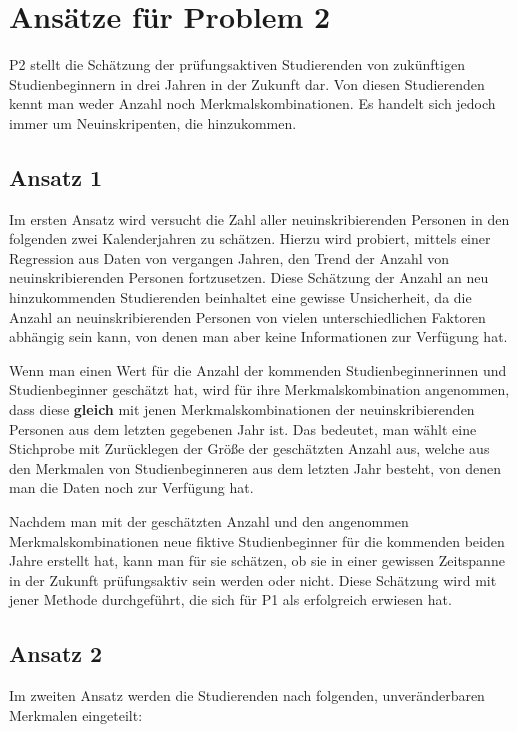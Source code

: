 

\section{Ans\"atze f\"ur Problem 2}
P2 stellt die Sch\"atzung der pr\"ufungsaktiven Studierenden von zuk\"unftigen Studienbeginnern in drei Jahren in der Zukunft dar. Von diesen Studierenden
kennt man weder Anzahl noch Merkmalskombinationen. Es handelt sich jedoch immer um Neuinskripenten, die hinzukommen.

\subsection{Ansatz 1}
Im ersten Ansatz wird versucht die Zahl aller neuinskribierenden Personen in den folgenden zwei Kalenderjahren zu sch\"atzen. Hierzu wird probiert, mittels einer Regression aus
Daten von vergangen Jahren, den Trend der Anzahl von neuinskribierenden Personen fortzusetzen. Diese Sch\"atzung der Anzahl an neu hinzukommenden Studierenden beinhaltet
eine gewisse Unsicherheit, da die Anzahl an neuinskribierenden Personen von vielen unterschiedlichen Faktoren abh\"angig sein kann, von denen man 
aber keine Informationen zur Verf\"ugung hat.

Wenn man einen Wert f\"ur die Anzahl der kommenden Studienbeginnerinnen und Studienbeginner gesch\"atzt hat, wird f\"ur ihre Merkmalskombination angenommen,
dass diese \textbf{gleich} mit jenen Merkmalskombinationen der neuinskribierenden Personen aus dem letzten gegebenen Jahr ist. Das bedeutet, man w\"ahlt eine Stichprobe mit Zur\"ucklegen 
der Gr\"o{\ss}e der gesch\"atzten Anzahl aus, welche aus den Merkmalen von Studienbeginneren aus dem letzten Jahr besteht, von denen man die Daten 
noch zur Verf\"ugung hat.

Nachdem man mit der gesch\"atzten Anzahl und den angenommen Merkmalskombinationen neue fiktive Studienbeginner f\"ur die kommenden beiden Jahre erstellt hat, kann man
f\"ur sie sch\"atzen, ob sie in einer gewissen Zeitspanne in der Zukunft pr\"ufungsaktiv sein werden oder nicht. Diese Sch\"atzung wird mit jener Methode durchgef\"uhrt, die
sich f\"ur P1 als erfolgreich erwiesen hat.


\subsection{Ansatz 2}
Im zweiten Ansatz werden die Studierenden nach folgenden, unver\"anderbaren Merkmalen eingeteilt:

